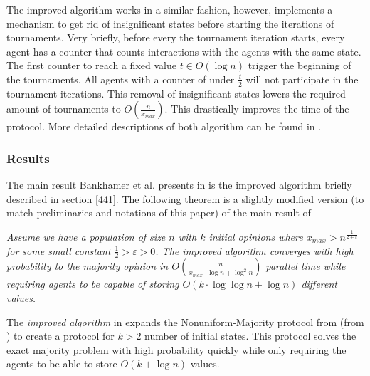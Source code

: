 The improved algorithm works in a similar fashion, however, implements a mechanism to get rid of insignificant states before starting the iterations of tournaments. Very briefly, before every the tournament iteration starts, every agent has a counter that counts interactions with the agents with the same state. The first counter to reach a fixed value $t \in O(\log n)$ trigger the beginning of the tournaments. All agents with a counter of under $\frac{t}{2}$ will not participate in the tournament iterations. This removal of insignificant states lowers the required amount of tournaments to $O(\frac{n}{x_{max}})$. This drastically improves the time of the protocol. More detailed descriptions of both algorithm can be found in \cite{bankhamerPopulationProtocolsExact2022}.

\subsubsection{Results}

The main result Bankhamer et al. presents in \cite{bankhamerPopulationProtocolsExact2022} is the improved algorithm briefly described in section \ref{441}. The following theorem is a slightly modified version (to match preliminaries and notations of this paper) of the main result of \cite{bankhamerPopulationProtocolsExact2022}

 \begin{theorem}
    \textit{
        Assume we have a population of size $n$ with $k$ initial opinions where $x_{max} > n^{\frac{1}{2 + \varepsilon}}$ for some small constant $\frac{1}{2} > \varepsilon > 0$. The \emph{improved algorithm} converges with high probability to the majority opinion in $O(\frac{n}{x_{max} \cdot \log n + \log^2 n})$ parallel time while requiring agents to be capable of storing $O(k \cdot \log \log n + \log n)$ different values.}
 \end{theorem} 

The \emph{improved algorithm} in \cite{bankhamerPopulationProtocolsExact2022} expands the Nonuniform-Majority protocol from  (from \cite{dotyTimeSpaceOptimal2022}) to create a protocol for $k > 2$ number of initial states. This protocol solves the exact majority problem with high probability quickly while only requiring the agents to be able to store $O(k + \log n)$ values. 
